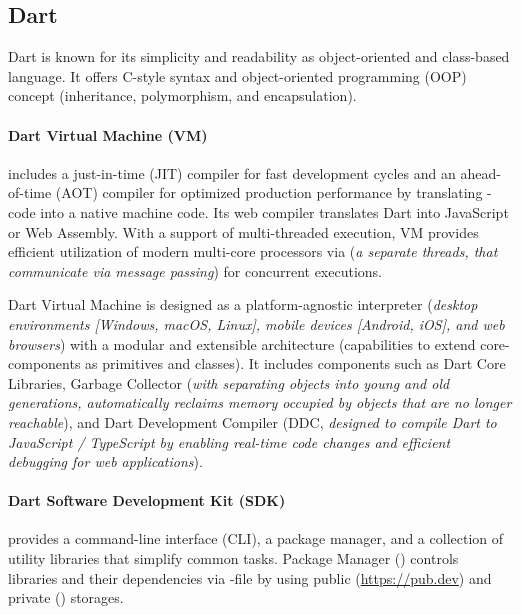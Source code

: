 
\subsection{Dart}
 \label{dart}

Dart is known for its simplicity and readability as object-oriented and class-based language. It offers C-style syntax
and object-oriented programming (OOP) concept (inheritance, polymorphism, and encapsulation).

\paragraph{Dart Virtual Machine (VM)} includes a just-in-time (JIT) compiler for fast development cycles and an
ahead-of-time (AOT) compiler for optimized production performance by translating -code into a native machine
code. Its web compiler translates Dart into JavaScript or Web Assembly. With a support of multi-threaded
execution, VM provides efficient utilization of modern multi-core processors via  (\emph{a separate threads,
that communicate via message passing}) for concurrent executions.

Dart Virtual Machine is designed as a platform-agnostic interpreter (\emph{desktop environments [Windows, macOS, Linux],
mobile devices [Android, iOS], and web browsers}) with a modular and extensible architecture (capabilities to extend
core-components as primitives and classes). It includes components such as Dart Core Libraries, Garbage Collector
(\emph{with separating objects into young and old generations, automatically reclaims memory occupied by objects that
are no longer reachable}), and Dart Development Compiler (DDC, \emph{designed to compile Dart to JavaScript / TypeScript
by enabling real-time code changes and efficient debugging for web applications}).

\paragraph{Dart Software Development Kit (SDK)} provides a command-line interface (CLI), a package manager,
and a collection of utility libraries that simplify common tasks. Package Manager () controls libraries and
their dependencies via -file by using public (\href{https://pub.dev}{https://pub.dev}) and private
() storages.

